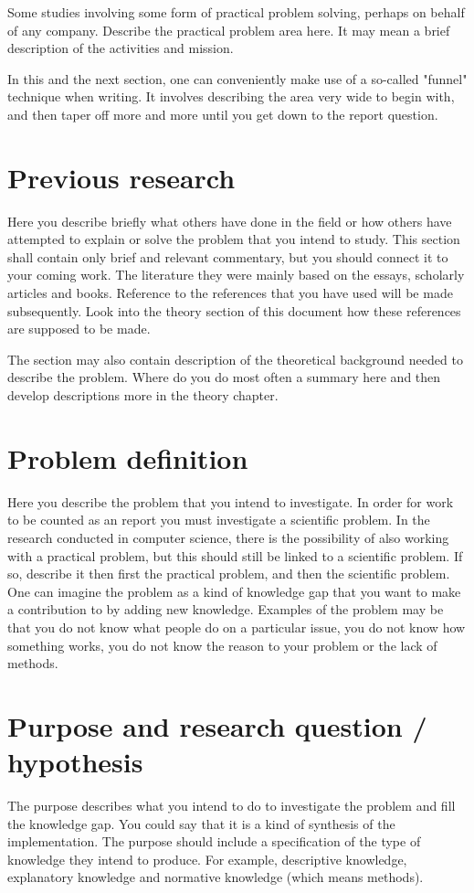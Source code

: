 Some studies involving some form of practical problem solving, perhaps on behalf of any company. Describe the practical problem area here. It may mean a brief description of the activities and mission.

In this and the next section, one can conveniently make use of a so-called "funnel" technique when writing. It involves describing the area very wide to begin with, and then taper off more and more until you get down to the report question.

\section{Previous research}
Here you describe briefly what others have done in the field or how others have attempted to explain or solve the problem that you intend to study. This section shall contain only brief and relevant commentary, but you should connect it to your coming work. The literature they were mainly based on the essays, scholarly articles and books. Reference to the references that you have used will be made subsequently. Look into the theory section of this document how these references are supposed to be made.

The section may also contain description of the theoretical background needed to describe the problem. Where do you do most often a summary here and then develop descriptions more in the theory chapter.

\section{Problem definition}
Here you describe the problem that you intend to investigate. In order for work to be counted as an report you must investigate a scientific problem. In the research conducted in computer science, there is the possibility of also working with a practical problem, but this should still be linked to a scientific problem. If so, describe it then first the practical problem, and then the scientific problem. One can imagine the problem as a kind of knowledge gap that you want to make a contribution to by adding new knowledge. Examples of the problem may be that you do not know what people do on a particular issue, you do not know how something works, you do not know the reason to your problem or the lack of methods.

\section{Purpose and research question / hypothesis}
The purpose describes what you intend to do to investigate the problem and fill the knowledge gap. You could say that it is a kind of synthesis of the implementation. The purpose should include a specification of the type of knowledge they intend to produce. For example, descriptive knowledge, explanatory knowledge and normative knowledge (which means methods).

